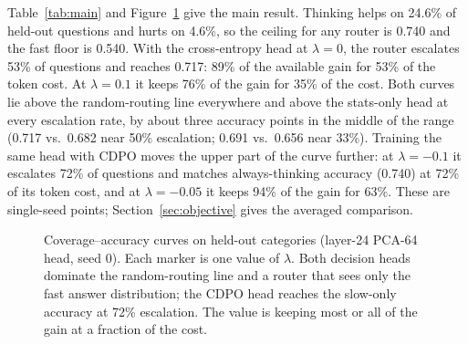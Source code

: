 \documentclass{article}
\newcommand{\method}{LitJev-S2}
\newcommand{\cdpo}{CDPO}
\begin{document}
Table~\ref{tab:main} and Figure~\ref{fig:curve} give the main result. Thinking helps on 24.6\% of held-out questions and hurts on 4.6\%, so the ceiling for any router is 0.740 and the fast floor is 0.540. With the cross-entropy head at $\lambda=0$, the router escalates 53\% of questions and reaches 0.717: 89\% of the available gain for 53\% of the token cost. At $\lambda=0.1$ it keeps 76\% of the gain for 35\% of the cost. Both curves lie above the random-routing line everywhere and above the stats-only head at every escalation rate, by about three accuracy points in the middle of the range (0.717 vs.\ 0.682 near 50\% escalation; 0.691 vs.\ 0.656 near 33\%). Training the same head with \cdpo{} moves the upper part of the curve further: at $\lambda=-0.1$ it escalates 72\% of questions and matches always-thinking accuracy (0.740) at 72\% of its token cost, and at $\lambda=-0.05$ it keeps 94\% of the gain for 63\%. These are single-seed points; Section~\ref{sec:objective} gives the averaged comparison.

\begin{figure}[t]
\centering
{}
\caption{Coverage--accuracy curves on held-out categories (layer-24 PCA-64 head, seed 0). Each marker is one value of $\lambda$. Both decision heads dominate the random-routing line and a router that sees only the fast answer distribution; the \cdpo{} head reaches the slow-only accuracy at 72\% escalation. The value is keeping most or all of the gain at a fraction of the cost.}
\label{fig:curve}
\end{figure}
\end{document}
